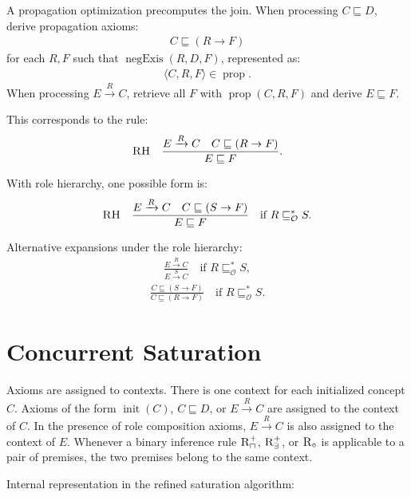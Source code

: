 \documentclass[11pt]{article}
\newcommand{\Ont}{\mathcal O}
\newcommand{\sub}{\sqsubseteq}
\newcommand{\compose}{\circ}
\newcommand{\init}{\operatorname{init}}
\newcommand{\negExis}{\operatorname{negExis}}
\begin{document}
A propagation optimization precomputes the join. When processing $C \sub D$, derive propagation axioms:
\begin{align*}
C \sub (R \to F)
\end{align*}
for each $R,F$ such that $\negExis(R,D,F)$, represented as:
\begin{align*}
\langle C,R,F\rangle \in \operatorname{prop}.
\end{align*}
When processing $E \xrightarrow{R} C$, retrieve all $F$ with $\operatorname{prop}(C,R,F)$ and derive $E \sub F$.

This corresponds to the rule:
\begin{align*}
\textsc{RH} \quad \frac{E \xrightarrow{R} C \quad C \sub (R \to F)}{E \sub F}.
\end{align*}

With role hierarchy, one possible form is:
\begin{align*}
\textsc{RH} \quad \frac{E \xrightarrow{R} C \quad C \sub (S \to F)}{E \sub F}
\quad \text{if } R \sub^{*}_{\Ont} S.
\end{align*}

Alternative expansions under the role hierarchy:
\begin{align*}
\frac{E \xrightarrow{R} C}{E \xrightarrow{S} C}
\quad \text{if } R \sub^{*}_{\Ont} S,
\end{align*}
\begin{align*}
\frac{C \sub (S \to F)}{C \sub (R \to F)}
\quad \text{if } R \sub^{*}_{\Ont} S.
\end{align*}

\section{Concurrent Saturation}

Axioms are assigned to contexts. There is one context for each initialized concept $C$. Axioms of the form $\init(C)$, $C \sub D$, or $E \xrightarrow{R} C$ are assigned to the context of $C$. In the presence of role composition axioms, $E \xrightarrow{R} C$ is also assigned to the context of $E$. Whenever a binary inference rule $\textsc{R}_{\sqcap}^{+}$, $\textsc{R}_{\exists}^{+}$, or $\textsc{R}_{\compose}$ is applicable to a pair of premises, the two premises belong to the same context.

Internal representation in the refined saturation algorithm:
\end{document}
